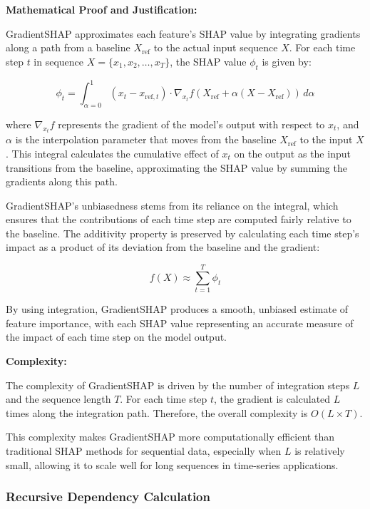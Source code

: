 \textbf{Mathematical Proof and Justification:}

GradientSHAP approximates each feature’s SHAP value by integrating gradients along a path from a baseline \( X_\text{ref} \) to the actual input sequence \( X \). For each time step \( t \) in sequence \( X = \{x_1, x_2, \ldots, x_T\} \), the SHAP value \( \phi_t \) is given by:

\[
\phi_t = \int_{\alpha=0}^1 (x_t - x_{\text{ref}, t}) \cdot \nabla_{x_t} f(X_\text{ref} + \alpha (X - X_\text{ref})) \, d\alpha
\]

where \( \nabla_{x_t} f \) represents the gradient of the model’s output with respect to \( x_t \), and \( \alpha \) is the interpolation parameter that moves from the baseline \( X_\text{ref} \) to the input \( X \). This integral calculates the cumulative effect of \( x_t \) on the output as the input transitions from the baseline, approximating the SHAP value by summing the gradients along this path.

GradientSHAP’s unbiasedness stems from its reliance on the integral, which ensures that the contributions of each time step are computed fairly relative to the baseline. The additivity property is preserved by calculating each time step’s impact as a product of its deviation from the baseline and the gradient:

\[
f(X) \approx \sum_{t=1}^{T} \phi_t
\]

By using integration, GradientSHAP produces a smooth, unbiased estimate of feature importance, with each SHAP value representing an accurate measure of the impact of each time step on the model output.

\textbf{Complexity:}

The complexity of GradientSHAP is driven by the number of integration steps \( L \) and the sequence length \( T \). For each time step \( t \), the gradient is calculated \( L \) times along the integration path. Therefore, the overall complexity is \( O(L \times T) \).

This complexity makes GradientSHAP more computationally efficient than traditional SHAP methods for sequential data, especially when \( L \) is relatively small, allowing it to scale well for long sequences in time-series applications.

\subsubsection{Recursive Dependency Calculation}

